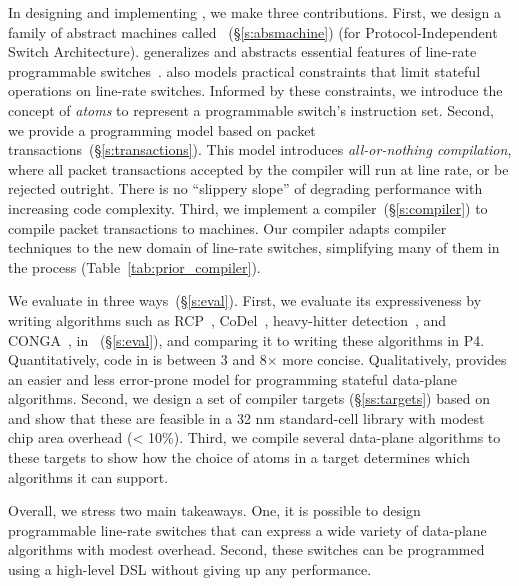 
In designing and implementing \pktlanguage, we make three contributions.
First, we design a family of abstract machines called
\absmachine~(\S\ref{s:absmachine}) (for Protocol-Independent Switch
Architecture). \absmachine generalizes and abstracts essential features of
line-rate programmable switches~\cite{rmt, xpliant, flexpipe}. \absmachine also
models practical constraints that limit stateful operations on line-rate
switches.  Informed by these constraints, we introduce the concept of {\em
atoms} to represent a programmable switch's instruction set.  Second, we
provide a programming model based on packet
transactions~(\S\ref{s:transactions}).  This model introduces
\textit{all-or-nothing compilation}, where all packet transactions accepted by
the compiler will run at line rate, or be rejected outright. There is no
``slippery slope'' of degrading performance with increasing code complexity.
Third, we implement a compiler~(\S\ref{s:compiler}) to compile packet
transactions to \absmachine machines. Our compiler adapts compiler techniques
to the new domain of line-rate switches, simplifying many of them in the
process (Table~\ref{tab:prior_compiler}).

We evaluate \pktlanguage in three ways~(\S\ref{s:eval}). First, we evaluate its
expressiveness by writing algorithms such as RCP~\cite{rcp},
CoDel~\cite{codel}, heavy-hitter detection~\cite{opensketch}, and
CONGA~\cite{conga}, in \pktlanguage~(\S\ref{s:eval}), and comparing it to
writing these algorithms in P4. Quantitatively, code in \pktlanguage is between
3 and 8$\times$ more concise. Qualitatively, \pktlanguage provides an easier
and less error-prone model for programming stateful data-plane algorithms.
Second, we design a set of compiler targets (\S\ref{ss:targets}) based on
\absmachine and show that these are feasible in a 32 nm standard-cell library
with modest chip area overhead (< 10\%). Third, we compile several data-plane
algorithms to these targets to show how the choice of atoms in a target
determines which algorithms it can support.

Overall, we stress two main takeaways. One, it is possible to design
programmable line-rate switches that can express a wide variety of data-plane
algorithms with modest overhead. Second, these switches can be programmed using
a high-level DSL without giving up any performance.
